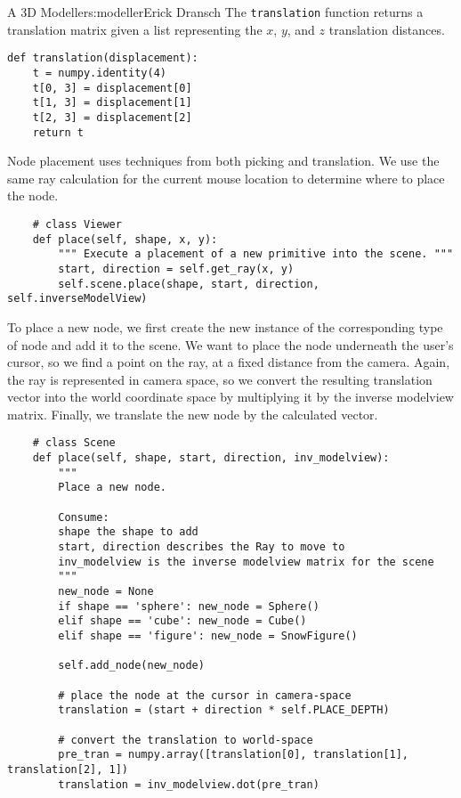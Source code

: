 \begin{aosachapter}{A 3D Modeller}{s:modeller}{Erick Dransch}
The \texttt{translation} function returns a translation matrix given a
list representing the $x$, $y$, and $z$ translation distances.

\begin{verbatim}
def translation(displacement):
    t = numpy.identity(4)
    t[0, 3] = displacement[0]
    t[1, 3] = displacement[1]
    t[2, 3] = displacement[2]
    return t
\end{verbatim}

\label{placing-nodes}

Node placement uses techniques from both picking and translation. We use
the same ray calculation for the current mouse location to determine
where to place the node.

\begin{verbatim}
    # class Viewer
    def place(self, shape, x, y):
        """ Execute a placement of a new primitive into the scene. """
        start, direction = self.get_ray(x, y)
        self.scene.place(shape, start, direction, self.inverseModelView)
\end{verbatim}

To place a new node, we first create the new instance of the
corresponding type of node and add it to the scene. We want to place the
node underneath the user's cursor, so we find a point on the ray, at a
fixed distance from the camera. Again, the ray is represented in camera
space, so we convert the resulting translation vector into the world
coordinate space by multiplying it by the inverse modelview matrix.
Finally, we translate the new node by the calculated vector.

\begin{verbatim}
    # class Scene
    def place(self, shape, start, direction, inv_modelview):
        """ 
        Place a new node.
            
        Consume:  
        shape the shape to add
        start, direction describes the Ray to move to
        inv_modelview is the inverse modelview matrix for the scene 
        """
        new_node = None
        if shape == 'sphere': new_node = Sphere()
        elif shape == 'cube': new_node = Cube()
        elif shape == 'figure': new_node = SnowFigure()
    
        self.add_node(new_node)
    
        # place the node at the cursor in camera-space
        translation = (start + direction * self.PLACE_DEPTH)
    
        # convert the translation to world-space
        pre_tran = numpy.array([translation[0], translation[1], translation[2], 1])
        translation = inv_modelview.dot(pre_tran)
    

\end{verbatim}
\end{aosachapter}
